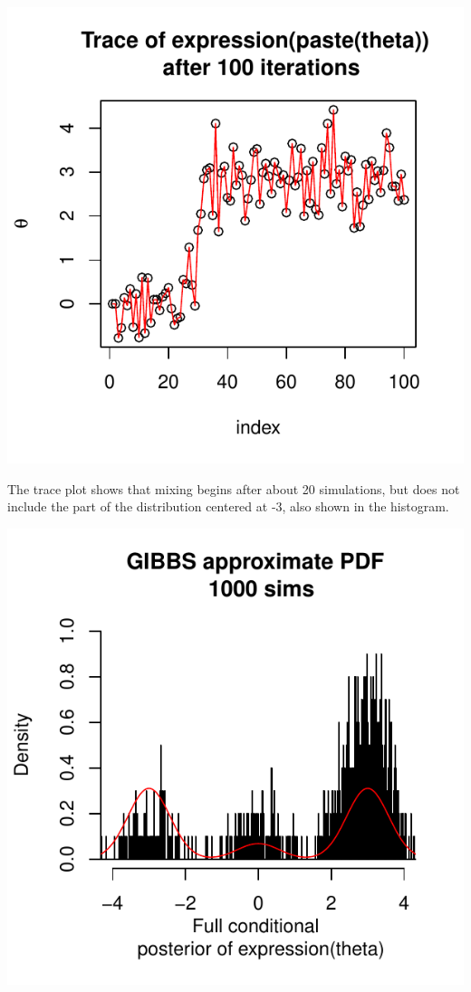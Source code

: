 \documentclass{article}\usepackage[]{graphicx}\usepackage[]{color}
\makeatletter
\def\maxwidth{ %
  \ifdim\Gin@nat@width>\linewidth
    \linewidth
  \else
    \Gin@nat@width
  \fi
}
\makeatother
\begin{document}
\begin{enumerate}
\includegraphics[width=\maxwidth]{figure/prob2-2} 


The trace plot shows that mixing begins after about 20 simulations, but does not include the part of the distribution centered at -3, also shown in the histogram.


\includegraphics[width=\maxwidth]{figure/prob2e4-1} 


\end{enumerate}
\end{document}
